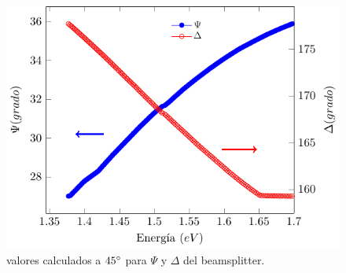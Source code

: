 \documentclass[paper=letter, fontsize=12pt]{scrartcl}
\numberwithin{equation}{section}		%
\numberwithin{figure}{section}			%
\numberwithin{table}{section}				%
\begin{document}
\begin{figure}[!hbt]
	\centering
	\includegraphics[scale=1.1]{figMet/figElips/grafPsidelta45.pdf}
	\caption[Gr\'aficas de $\Psi$ y $\Delta$ del beamspliter a $70 \degree$.]{valores calculados a $45\degree$  para $\Psi$ y $\Delta$ del beamsplitter.}
	\label{Met:fig:ElipBS45}
\end{figure}
\end{document}
